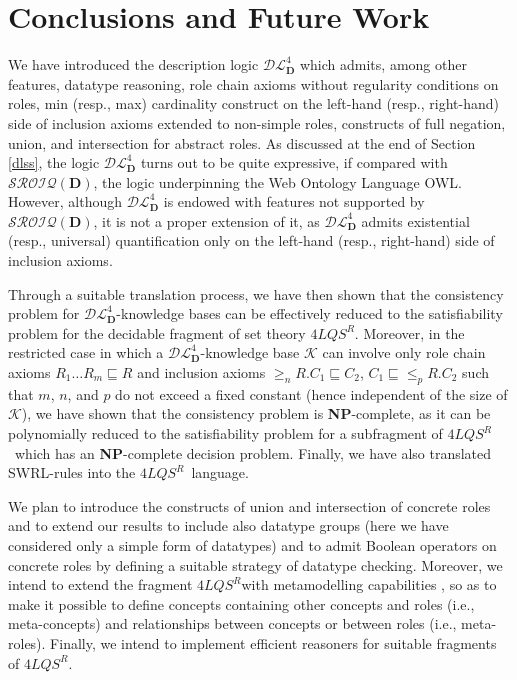 \documentclass[a4paper]{llncs}
\newcommand{\shdlss}{\mathcal{DL}_{\D}^{4}}
\newcommand{\sroiqd}{\ensuremath{\mathcal{SROIQ}(\D)}}
\newcommand{\flqsr}{\ensuremath{4LQS^R}}
\newcommand{\D}{\mathbf{D}}
\begin{document}
\section{Conclusions and Future Work}\label{conclusions}
We have introduced the description logic $\shdlss$ which admits, among other features, datatype reasoning, role chain axioms without regularity conditions on roles, min (resp., max) cardinality construct on the left-hand (resp., right-hand) side of inclusion axioms extended to non-simple roles, constructs of full negation, union, and intersection for abstract roles. As discussed at the end of Section \ref{dlss}, the logic $\shdlss$ turns out to be quite expressive, if compared with \sroiqd, the logic underpinning the Web Ontology Language OWL.
However, although $\shdlss$ is endowed with features not supported by \sroiqd, it is not a proper extension of it, as $\shdlss$ admits existential (resp., universal) quantification only on the left-hand (resp., right-hand) side of inclusion axioms.

Through a suitable translation process, we have then shown that the consistency problem for $\shdlss$-knowledge bases can be effectively reduced to the satisfiability problem for the decidable fragment of set theory \flqsr. Moreover, in the restricted case in which a $\shdlss$-knowledge base $\mathcal{K}$ can involve only role chain axioms $R_1 \ldots R_ m \sqsubseteq R$ and inclusion axioms ${\geq_n\!\! R. C_1} \sqsubseteq C_2$, $C_1 \sqsubseteq {\leq_p\!\!R.C_2}$ such that $m$, $n$, and $p$ do not exceed a fixed constant (hence independent of the size of $\mathcal{K}$), we have shown that the consistency problem is \textbf{NP}-complete, as it can be polynomially reduced to the satisfiability problem for a subfragment of \flqsr\ which has an \textbf{NP}-complete decision problem.  Finally, we have also translated SWRL-rules into the \flqsr\ language.




We plan to introduce the constructs of union and intersection of concrete roles and to extend our results to include also datatype groups (here we have considered only a simple form of datatypes) and to admit Boolean operators on concrete roles by defining a suitable strategy of datatype checking. Moreover, we intend to extend the fragment \flqsr\space with metamodelling capabilities \cite{Motik05,GlimmRV10,HomolaKSV14}, so as to make it possible to define concepts containing other concepts and roles (i.e., meta-concepts) and relationships between concepts or between roles (i.e., meta-roles).
Finally, we intend to implement efficient reasoners for suitable fragments of
\flqsr.



 
\end{document}
